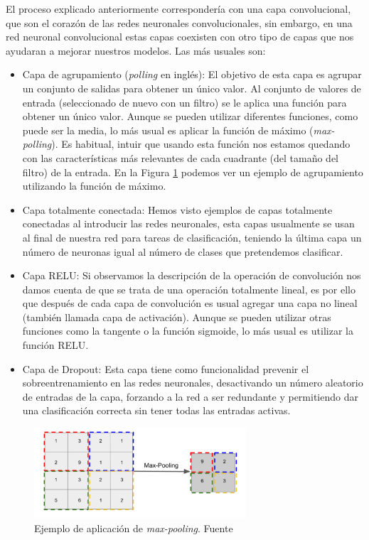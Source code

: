 El proceso explicado anteriormente correspondería con una capa convolucional, que son el corazón de las redes neuronales convolucionales, sin embargo, en una red neuronal convolucional estas capas coexisten con otro tipo de capas que nos ayudaran a mejorar nuestros modelos. Las más usuales son:

\begin{itemize}
	\item Capa de agrupamiento (\textit{polling} en inglés): El objetivo de esta capa es agrupar un conjunto de salidas para obtener un único valor. Al conjunto de valores de entrada (seleccionado de nuevo con un filtro) se le aplica una función para obtener un único valor. Aunque se pueden utilizar diferentes funciones, como puede ser la media, lo más usual es aplicar la función de máximo (\textit{max-polling}). Es habitual, intuir que usando esta función nos estamos quedando con las características más relevantes de cada cuadrante (del tamaño del filtro) de la entrada. En la Figura \ref{fig:pooling} podemos ver un ejemplo de agrupamiento utilizando la función de máximo. 
	\item Capa totalmente conectada: Hemos visto ejemplos de capas totalmente conectadas al introducir las redes neuronales, esta capas usualmente se usan al final de nuestra red para tareas de clasificación, teniendo la última capa un número de neuronas igual al número de clases que pretendemos clasificar. 
	\item Capa RELU: Si observamos la descripción de la operación de convolución nos damos cuenta de que se trata de una operación totalmente lineal, es por ello que después de cada capa de convolución es usual agregar una capa no lineal (también llamada capa de activación). Aunque se pueden utilizar otras funciones como la tangente o la función sigmoide, lo más usual es utilizar la función RELU.
	
	\item Capa de Dropout: Esta capa tiene como funcionalidad prevenir el sobreentrenamiento en las redes neuronales, desactivando un número aleatorio de entradas de la capa, forzando a la red a ser redundante y permitiendo dar una clasificación correcta sin tener todas las entradas activas. 
	
\end{itemize}

\begin{figure}[!ht]
	\centering
	\includegraphics[width=0.7\textwidth]{images/arte/pooling}
	\caption{Ejemplo de aplicación de \textit{max-pooling}. Fuente \cite{temariodeeplearning}}
	\label{fig:pooling}
\end{figure}



